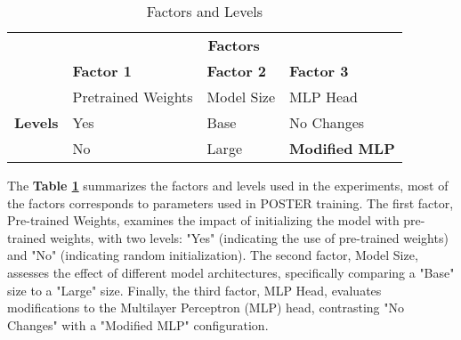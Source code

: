 \begin{table}[H]
\centering
\caption{Factors and Levels}
\label{tab:factors_and_levels}
\begin{tabular}{clll}
\hline
\multicolumn{1}{l}{}             & \multicolumn{3}{c}{\textbf{Factors}}                       \\
\multicolumn{1}{l}{}             & \textbf{Factor 1}  & \textbf{Factor 2} & \textbf{Factor 3} \\ \hline
\multirow{3}{*}{\textbf{Levels}} & Pretrained Weights & Model Size        & MLP Head          \\
                                 & Yes                & Base              & No Changes        \\
                                 & No                 & Large             & \textbf{Modified MLP}      \\ \hline
\end{tabular}
\end{table}



The \textbf{Table \ref{tab:factors_and_levels}} summarizes the factors and levels used in the experiments, most of the factors corresponds to parameters used in  POSTER \cite{zheng_poster_2022} training.  The first factor, Pre-trained Weights, examines the impact of initializing the model with pre-trained weights, with two levels: "Yes" (indicating the use of pre-trained weights) and "No" (indicating random initialization). The second factor, Model Size, assesses the effect of different model architectures, specifically comparing a "Base" size to a "Large" size. Finally, the third factor, MLP Head, evaluates modifications to the Multilayer Perceptron (MLP) head, contrasting "No Changes" with a "Modified MLP" configuration. 





